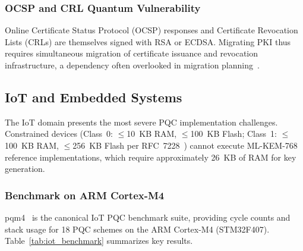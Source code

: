 \documentclass[journal]{IEEEtran}
\begin{document}
\subsubsection{OCSP and CRL Quantum Vulnerability}

Online Certificate Status Protocol (OCSP) responses and Certificate Revocation
Lists (CRLs) are themselves signed with RSA or ECDSA. Migrating PKI thus
requires simultaneous migration of certificate issuance and revocation
infrastructure, a dependency often overlooked in migration planning~\cite{hoffman2023migration}.

\subsection{IoT and Embedded Systems}
\label{sec:iot}

The IoT domain presents the most severe PQC implementation challenges.
Constrained devices (Class~0: $\leq$10~KB RAM, $\leq$100~KB Flash; Class~1:
$\leq$100~KB RAM, $\leq$256~KB Flash per RFC~7228~\cite{rfc7228}) cannot
execute ML-KEM-768 reference implementations, which require approximately
26~KB of RAM for key generation.

\subsubsection{Benchmark on ARM Cortex-M4}

pqm4~\cite{kannwischer2019pqm4} is the canonical IoT PQC benchmark suite,
providing cycle counts and stack usage for 18 PQC schemes on the ARM
Cortex-M4 (STM32F407). Table~\ref{tab:iot_benchmark} summarizes key results.
\end{document}
